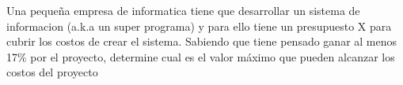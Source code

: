 Una pequeña empresa de informatica tiene que desarrollar un sistema de informacion (a.k.a un super programa) y para ello tiene un presupuesto X para cubrir los costos de crear el sistema. Sabiendo que tiene pensado ganar al menos 17\% por el proyecto, determine cual es el valor máximo que pueden alcanzar los costos del proyecto

